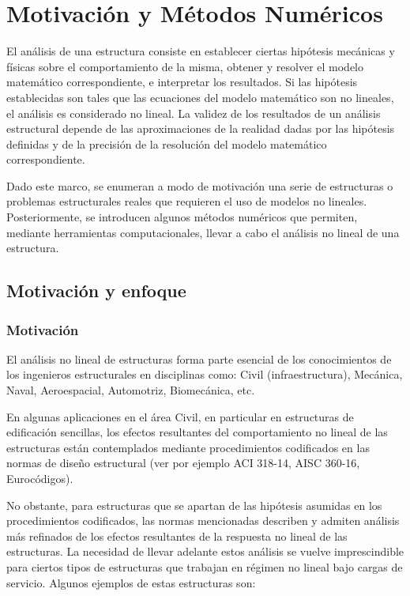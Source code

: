 \chapter{Motivación y Métodos Numéricos}\label{cap1INTRO}


El análisis de una estructura consiste en establecer ciertas hipótesis mecánicas y físicas sobre el comportamiento de la misma, obtener y resolver el modelo matemático correspondiente, e interpretar los resultados. %
%
Si las hipótesis establecidas son tales que las ecuaciones del modelo matemático son no lineales, el análisis es considerado no lineal. %
%
La validez de los resultados de un análisis estructural depende de las aproximaciones de la realidad dadas por las hipótesis definidas y de la precisión de la resolución del modelo matemático correspondiente. %

%
Dado este marco, se enumeran a modo de motivación una serie de estructuras o problemas estructurales reales que requieren el uso de modelos no lineales. %
%
Posteriormente, se introducen algunos métodos numéricos que permiten, mediante herramientas computacionales, llevar a cabo el análisis no lineal de una estructura.


\section{Motivación y enfoque}

\subsection*{Motivación}

El análisis no lineal de estructuras forma parte esencial de los conocimientos de los ingenieros estructurales en  disciplinas como: Civil (infraestructura), Mecánica, Naval, Aeroespacial, Automotriz, Biomecánica, etc.  

En algunas aplicaciones en el área Civil, en particular en estructuras de edificación sencillas, los efectos resultantes del comportamiento no lineal de las estructuras están contemplados mediante procedimientos codificados en las normas de diseño estructural (ver por ejemplo ACI 318-14, AISC 360-16, Eurocódigos).

No obstante, para estructuras que se apartan de las hipótesis asumidas en los procedimientos codificados, las normas mencionadas describen y admiten análisis más refinados de los efectos resultantes de la respuesta no lineal de las estructuras. %
%
La necesidad de llevar adelante estos análisis se vuelve imprescindible para ciertos tipos de estructuras que trabajan en régimen no lineal bajo cargas de servicio. Algunos ejemplos de estas estructuras son:


